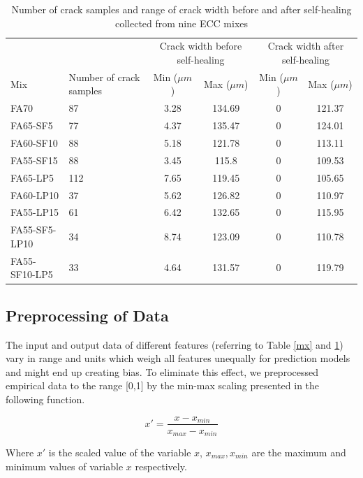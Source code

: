 \documentclass[11pt]{article}
\begin{document}
	\begin{table}[!h]
		\centering
		\caption{Number of crack samples and range of crack width before and after self-healing collected from nine ECC mixes}
		\label{min}
		\begin{tabular}{p{1.02in}p{1.2in}cccc}
			\toprule
			&		&	\multicolumn{2}{p{1.9in}}{Crack width before self-healing}	&	\multicolumn{2}{p{1.8in}}{Crack width after self-healing}	\\ \cmidrule(r){3-6}
			Mix	&	Number of crack samples	&	Min	($\mu m$) &	Max ($\mu m$)	&	Min ($\mu m$)	&	Max ($\mu m$)	\\
			\midrule
			FA70	&	87	&	3.28	&	134.69	&	0	&	121.37	\\
			FA65-SF5	&	77	&	4.37	&	135.47	&	0	&	124.01	\\
			FA60-SF10	&	88	&	5.18	&	121.78	&	0	&	113.11	\\
			FA55-SF15	&	88	&	3.45	&	115.8	&	0	&	109.53	\\
			FA65-LP5	&	112	&	7.65	&	119.45	&	0	&	105.65	\\
			FA60-LP10	&	37	&	5.62	&	126.82	&	0	&	110.97	\\
			FA55-LP15	&	61	&	6.42	&	132.65	&	0	&	115.95	\\
			FA55-SF5-LP10	&	34	&	8.74	&	123.09	&	0	&	110.78	\\
			FA55-SF10-LP5	&	33	&	4.64	&	131.57	&	0	&	119.79	\\
			\bottomrule
		\end{tabular}
	\end{table}
	

	
	\subsection{Preprocessing of Data}
	
	The input and output data of different features (referring to Table \ref{mx} and \ref{min}) vary in range and units which weigh all features unequally for prediction models and might end up creating bias. To eliminate this effect, we preprocessed empirical data to the range [0,1] by the min-max scaling presented in the following function. 
	
	\begin{equation}
	x' = \frac{x - x_{min}}{x_{max} - x_{min}}
	\end{equation}
	
	
	Where $x'$ is the scaled value of the variable $x$, $x_{max}, x_{min}$ are the maximum and minimum values of variable $x$ respectively. 
	
\end{document}
